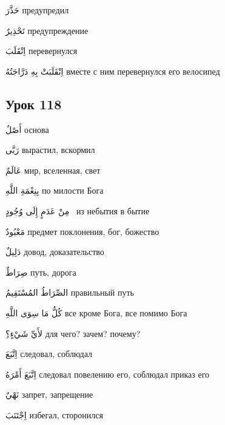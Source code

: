 \documentclass[a5paper]{article}
\newcommand\textstyleDropCaps[1]{#1}
\newcommand\textstyleCaptioncharacters[1]{#1}
\begin{document}
\textstyleCaptioncharacters{حَذَّرَ }\textstyleDropCaps{предупредил‎}

\textstyleCaptioncharacters{تَحْذِيرٌ }\textstyleDropCaps{предупреждение‎}

\textstyleCaptioncharacters{اِنْقَلَبَ }\textstyleDropCaps{перевернулся‎}

\textstyleCaptioncharacters{اِنْقَلَبَتْ بِهِ دَرَّاجَتُهُ }\textstyleDropCaps{вме­сте с ним перевернулся его велосипед ‎}

\subsection[Урок 118‎]{\textstyleDropCaps{Урок 118‎}}
\textstyleCaptioncharacters{أَصْلٌ }\textstyleDropCaps{основа‎}

\textstyleCaptioncharacters{رَبَّى }\textstyleDropCaps{вырастил, вскормил ‎}

\textstyleCaptioncharacters{عَالَمٌ }\textstyleDropCaps{мир, вселенная, свет ‎}

\textstyleCaptioncharacters{بِنِعْمَةِ اللَّهِ }\textstyleDropCaps{по милости Бога‎}

\textstyleCaptioncharacters{مِنْ عَدَمٍ إِلَى وُجُودٍ \ }\textstyleDropCaps{из небытия в бытие ‎}

\textstyleCaptioncharacters{مَعْبُودٌ }\textstyleDropCaps{предмет поклоне­ния, бог, божество‎}

\textstyleCaptioncharacters{دَلِيلٌ }\textstyleDropCaps{довод, доказатель­ство‎}

\textstyleCaptioncharacters{صِرَاطٌ }\textstyleDropCaps{путь, дорога ‎}

\textstyleCaptioncharacters{الصِّرَاطُ المُسْتَقِيمُ }\textstyleDropCaps{пра­вильный путь ‎}

\textstyleCaptioncharacters{كُلُّ مَا سِوَى اللَّهِ }\textstyleDropCaps{все кроме Бога, все помимо Бога‎}

\textstyleCaptioncharacters{ِلأَيِّ شَيْءٍ؟ }\textstyleDropCaps{для чего? зачем? почему?‎}

\textstyleCaptioncharacters{اِتَّبَعَ }\textstyleDropCaps{следовал, соблюдал‎}

\textstyleCaptioncharacters{اِتَّبَعَ أَمْرَهُ }\textstyleDropCaps{следовал пове­лению его, соблюдал приказ его‎}

\textstyleCaptioncharacters{نَهْيٌ }\textstyleDropCaps{запрет, запрещение ‎}

\textstyleCaptioncharacters{اِجْتَنَبَ }\textstyleDropCaps{избегал, сторо­нился‎}
\end{document}
